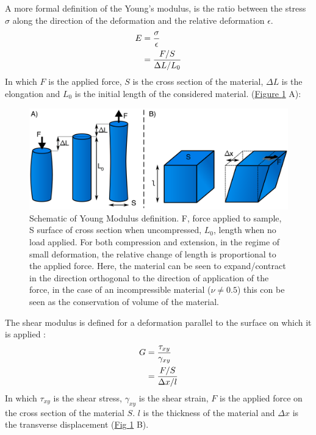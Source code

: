 \documentclass[A4paperpaper,11pt,english]{sphinxmanual}
\begin{document}
A  more formal definition of the Young's modulus, is the ratio between
the stress \(\sigma\) along the direction of the deformation and the relative deformation \(\epsilon\).
\begin{gather}
\begin{split}E &= \frac{\sigma}{\epsilon} \\
  & = \frac{   F/S }{   \Delta L / L_0        }\end{split}\notag
\end{gather}
In which \(F\) is the applied force, \(S\) is the cross section of the
material, \(\Delta L\) is the elongation and \(L_0\) is the initial
length of the considered material.  (\hyperref[parts/part1:fym]{Figure  \ref*{parts/part1:fym}} A):
\begin{figure}[htbp]
\centering
\capstart

\includegraphics[width=0.800\linewidth]{youngm.png}
\caption{Schematic of Young Modulus definition. F, force applied to sample, S
surface of cross section when uncompressed, \(L_0\), length when no load
applied. For both compression and extension, in the regime of small
deformation, the relative change of length is proportional to the applied
force. Here, the material can be seen to expand/contract in the direction
orthogonal to the direction of application of the force, in the case of an
incompressible material (\(\nu \neq 0.5\)) this con be seen as the
conservation of volume of the material.}\label{parts/part1:fym}\end{figure}

The shear modulus is defined for a deformation parallel to the surface on which it is applied :
\begin{gather}
\begin{split}G &= \frac{\tau_{xy}}{\gamma_{xy}} \\
   & = \frac{   F/S }{   \Delta x / l        }\end{split}\notag
\end{gather}
In which \(\tau_{xy}\) is the shear stress, \(\gamma_{xy}\) is the shear strain, \(F\) is the applied force on the cross section of the material \(S\). \(l\) is the thickness of the material and \(\Delta x\) is the transverse displacement (\hyperref[parts/part1:fym]{Fig  \ref*{parts/part1:fym}} B).
\end{document}
